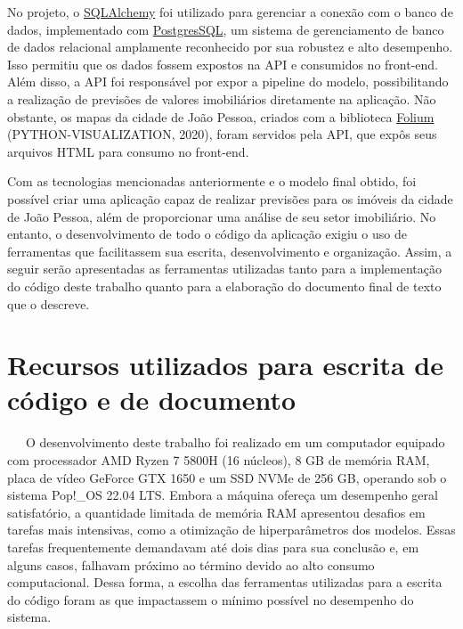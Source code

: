 \documentclass[
  12pt,
  a4paper,
]{scrreprt}
\begin{document}
\vspace{12pt}

No projeto, o \href{https://www.sqlalchemy.org/}{SQLAlchemy} foi
utilizado para gerenciar a conexão com o banco de dados, implementado
com \href{https://www.postgresql.org/}{PostgresSQL}, um sistema de
gerenciamento de banco de dados relacional amplamente reconhecido por
sua robustez e alto desempenho. Isso permitiu que os dados fossem
expostos na API e consumidos no front-end. Além disso, a API foi
responsável por expor a pipeline do modelo, possibilitando a realização
de previsões de valores imobiliários diretamente na aplicação. Não
obstante, os mapas da cidade de João Pessoa, criados com a biblioteca
\href{https://python-visualization.github.io/folium/latest/}{Folium}
(PYTHON-VISUALIZATION, 2020), foram servidos pela API, que expôs seus
arquivos HTML para consumo no front-end.

\vspace{12pt}

Com as tecnologias mencionadas anteriormente e o modelo final obtido,
foi possível criar uma aplicação capaz de realizar previsões para os
imóveis da cidade de João Pessoa, além de proporcionar uma análise de
seu setor imobiliário. No entanto, o desenvolvimento de todo o código da
aplicação exigiu o uso de ferramentas que facilitassem sua escrita,
desenvolvimento e organização. Assim, a seguir serão apresentadas as
ferramentas utilizadas tanto para a implementação do código deste
trabalho quanto para a elaboração do documento final de texto que o
descreve.

\section{Recursos utilizados para escrita de código e de
documento}\label{recursos-utilizados-para-escrita-de-cuxf3digo-e-de-documento}

~~~O desenvolvimento deste trabalho foi realizado em um computador
equipado com processador AMD Ryzen 7 5800H (16 núcleos), 8 GB de memória
RAM, placa de vídeo GeForce GTX 1650 e um SSD NVMe de 256 GB, operando
sob o sistema Pop!\_OS 22.04 LTS. Embora a máquina ofereça um desempenho
geral satisfatório, a quantidade limitada de memória RAM apresentou
desafios em tarefas mais intensivas, como a otimização de
hiperparâmetros dos modelos. Essas tarefas frequentemente demandavam até
dois dias para sua conclusão e, em alguns casos, falhavam próximo ao
término devido ao alto consumo computacional. Dessa forma, a escolha das
ferramentas utilizadas para a escrita do código foram as que impactassem
o mínimo possível no desempenho do sistema.
\end{document}
